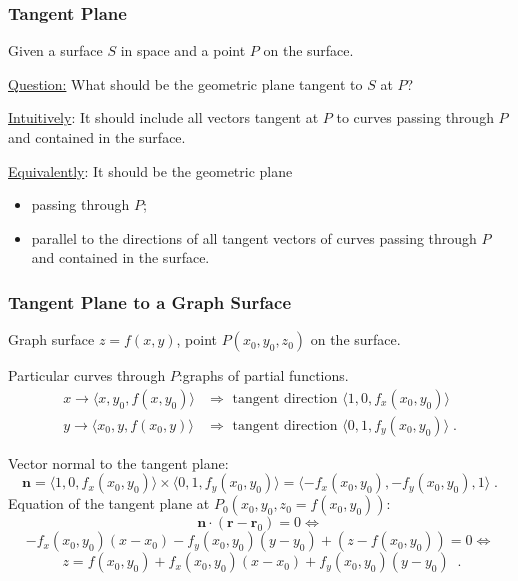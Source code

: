 \begin{frame}
  \frametitle{Tangent Plane}

Given a surface $S$ in space and a point $P$ on the surface.

\bigskip

\underline{Question:} What should be the geometric plane tangent to $S$ at $P$?

\pause
\bigskip

\underline{Intuitively}: It should include all vectors tangent at $P$ to curves passing through $P$ and contained in the surface.

\bigskip

\underline{Equivalently}: It should be the geometric plane
\begin{itemize}
  \item passing through $P$;
  \item parallel to the directions of all tangent vectors of curves passing through $P$ and contained in the surface.
\end{itemize}

\end{frame}

\begin{frame}
  \frametitle{Tangent Plane to a Graph Surface}

Graph surface $z=f(x,y)$, point $P(x_0,y_0,z_0)$ on the surface.

Particular curves through $P$:\pause graphs of partial functions.
%
\begin{align*}
  x \to \langle x,y_0, f(x,y_0) \rangle & \Longrightarrow \text{ tangent direction } \langle 1,0,f_x(x_0,y_0)\rangle \\
%
     y\to \langle x_0,y, f(x_0,y) \rangle & \Longrightarrow \text{ tangent direction } \langle 0,1,f_y(x_0,y_0)\rangle \; .
\end{align*}

Vector normal to the tangent plane:\pause
%
$$
  \textbf{n} =  \langle 1,0,f_x(x_0,y_0)\rangle \times \langle 0,1,f_y(x_0,y_0)\rangle =
\langle -f_x(x_0,y_0), -f_y(x_0,y_0), 1 \rangle\; .
$$
%
Equation of the tangent plane at $P_0(x_0,y_0,z_0=f(x_0,y_0))$:
%
$$\textbf{n} \cdot (\textbf{r}-\textbf{r}_0) = 0 \Longleftrightarrow$$
%
$$-f_x(x_0,y_0) (x-x_0) -f_y(x_0,y_0)(y-y_0) + (z-f(x_0,y_0)) = 0 \Longleftrightarrow $$
%
$$\boxed{ \; z= f(x_0,y_0) + f_x(x_0,y_0) (x-x_0) + f_y(x_0,y_0)(y-y_0) \; }\; .$$
%
\end{frame}

